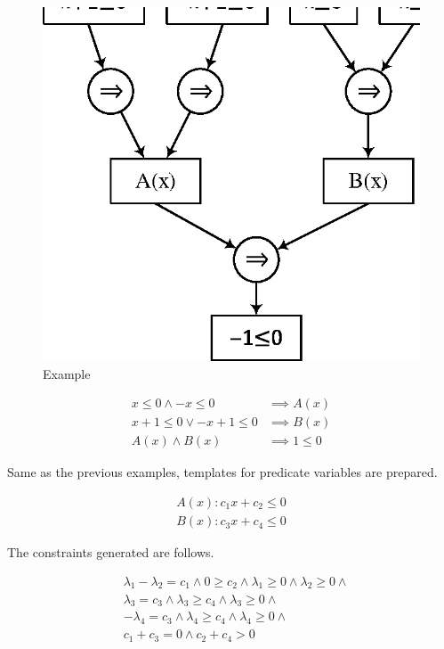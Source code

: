 \begin{figure}
  \begin{center}
    \includegraphics[scale=1]{figures/ex3-1.eps}
  \end{center}
  \caption{Example}
\end{figure}

\begin{align*}
x \leq 0 \wedge -x \leq 0 & \implies A(x) \\
x+1 \leq 0 \vee -x+1 \leq 0 & \implies B(x) \\
A(x) \wedge B(x) & \implies 1 \leq 0
\end{align*}

Same as the previous examples, templates for predicate variables are
prepared.

\begin{align*}
A(x) : c_1 x + c_2 \leq 0 \\ B(x) : c_3 x + c_4 \leq 0
\end{align*}

The constraints generated are follows.

\begin{align*}
& \lambda_1 - \lambda_2 = c_1 \wedge 0 \geq c_2 \wedge \lambda_1 \geq 0 \wedge \lambda_2 \geq 0 \wedge \\
& \lambda_3 = c_3 \wedge \lambda_3 \geq c_4 \wedge \lambda_3 \geq 0 \wedge \\
& - \lambda_4 = c_3 \wedge \lambda_4 \geq c_4 \wedge \lambda_4 \geq 0 \wedge \\
& c_1 + c_3 = 0 \wedge c_2 + c_4 > 0
\end{align*}


